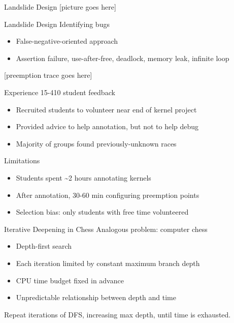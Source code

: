 \documentclass[xcolor=dvipsnames]{beamer}
\begin{document}
\begin{frame}{Landslide Design}
	[picture goes here]
\end{frame}

\begin{frame}{Landslide Design}
	Identifying bugs
	\begin{itemize}
		\item False-negative-oriented approach %
		\item Assertion failure, use-after-free, deadlock, memory leak, infinite loop
	\end{itemize}
	\pause
	\linegap

	[preemption trace goes here]
\end{frame}

\begin{frame}{Experience}
	15-410 student feedback
	\begin{itemize}
		\item Recruited students to volunteer near end of kernel project
		\item Provided advice to help annotation, but not to help debug
		\item Majority of groups found previously-unknown races
	\end{itemize}
	\pause
	\linegap

	Limitations
	\begin{itemize}
		\item Students spent \textasciitilde{}2 hours annotating kernels
		\item After annotation, 30-60 min configuring preemption points
		\item Selection bias: only students with free time volunteered
	\end{itemize}
\end{frame}


\begin{frame}{Iterative Deepening in Chess}
	Analogous problem: computer chess
	\begin{itemize}
		\item Depth-first search
		\item Each iteration limited by constant maximum branch depth
		\item CPU time budget fixed in advance
		\item Unpredictable relationship between depth and time
	\end{itemize}
	\pause
	\linegap
	Repeat iterations of DFS, increasing max depth, until time is exhausted.
\end{frame}
\end{document}
